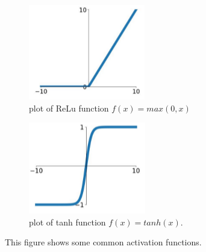 \begin{figure}
\centering
\begin{subfigure}{.5\textwidth}
  \centering
  \includegraphics[width=.6\linewidth]{ReLu.png}
  \caption{plot of ReLu function $f(x) = max(0,x)$}
  \label{fig:ReLu}
\end{subfigure}%
\begin{subfigure}{.5\textwidth}
  \centering
  \includegraphics[width=.6\linewidth]{tanh(x).png}
  \caption{plot of tanh function $f(x) = tanh(x)$.}
  \label{fig:tanh}
\end{subfigure}
\caption{This figure shows some common activation functions.}
\label{fig:activation}
\end{figure}


